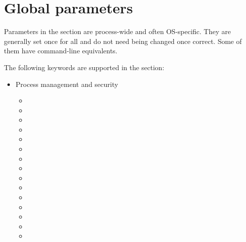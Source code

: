 
\chapter{Global parameters}

\hypertarget{keyword.global}{}
Parameters in the  section are process-wide and often OS-specific. 
They are generally set once for all and do not need being changed once correct.
Some of them have command-line equivalents.

The following keywords are supported in the  section:

\begin{itemize}
\item Process management and security
	\begin{itemize}
	\item {}
	\item {}
	\item {}
	\item {}
	\item {}
	\item {}
	\item {}
	\item {}
	\item {}
	\item {}
	\item {}
	\item {}
	\item {}
	\item {}
	\item {}
	\end{itemize}


\end{itemize}
